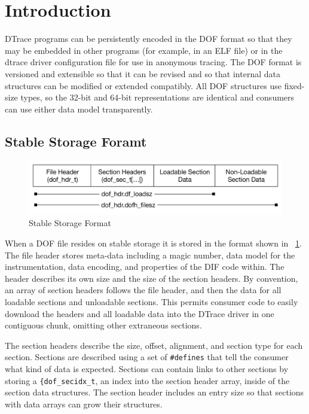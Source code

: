 \section{Introduction}
\label{sec:dof-intro}

DTrace programs can be persistently encoded in the DOF format so that
they may be embedded in other programs (for example, in an ELF file)
or in the dtrace driver configuration file for use in anonymous
tracing.  The DOF format is versioned and extensible so that it can be
revised and so that internal data structures can be modified or
extended compatibly.  All DOF structures use fixed-size types, so the
32-bit and 64-bit representations are identical and consumers can use
either data model transparently.

\subsection{Stable Storage Foramt}
\label{sec:dof-stable-storage}

\begin{figure}[h]
  \centering
  \includegraphics[width=.8\textwidth]{dof-stable-format}
  \caption{Stable Storage Format}
  \label{fig:stable-storage-format}
\end{figure}


When a DOF file resides on stable storage it is stored in the format
shown in ~\ref{fig:stable-storage-format}. The file header stores
meta-data including a magic number, data model for the
instrumentation, data encoding, and properties of the DIF code within.
The header describes its own size and the size of the section headers.
By convention, an array of section headers follows the file header,
and then the data for all loadable sections and unloadable sections.
This permits consumer code to easily download the headers and all
loadable data into the DTrace driver in one contiguous chunk, omitting
other extraneous sections.

The section headers describe the size, offset, alignment, and section
type for each section.  Sections are described using a set of \verb|#defines|
that tell the consumer what kind of data is expected.  Sections can
contain links to other sections by storing a \verb|{dof_secidx_t|, an index
into the section header array, inside of the section data structures.
The section header includes an entry size so that sections with data
arrays can grow their structures.

